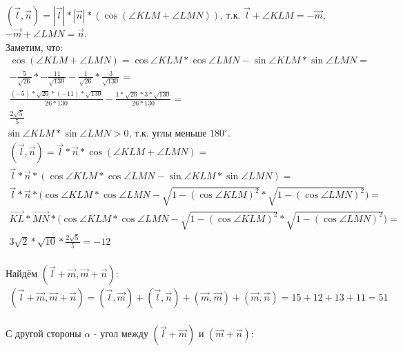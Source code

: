 		$(\overrightarrow{l}, \overrightarrow{n}) = |\overrightarrow{l}|*|\overrightarrow{n}|*(\cos(\angle KLM + \angle LMN))$, т.к. $\overrightarrow{l} + \angle KLM = - \overrightarrow{m}$, $-\overrightarrow{m} + \angle LMN = \overrightarrow{n}$.\\ Заметим, что: 
		\begin{gather*} 
			\cos(\angle KLM + \angle LMN) = 
			\cos \angle KLM * \cos \angle LMN - \sin \angle KLM * \sin \angle LMN = \\
			-\frac{5}{\sqrt{26}} * -\frac{11}{\sqrt{130}} - \frac{1}{\sqrt{26}} * \frac{3}{\sqrt{130}} = \\
			\frac{(-5)*\sqrt{26}*(-11)*\sqrt{130}}{26*130} - \frac{1*\sqrt{26}*3*\sqrt{130}}{26*130} = \\
			\frac{2 \sqrt{5}}{5}
		\end{gather*}
		$\sin \angle KLM * \sin \angle LMN > 0$, т.к. углы меньше $180^\circ$.
		\\
		\begin{gather*} 
			(\overrightarrow{l}, \overrightarrow{n}) = \overrightarrow{l} * \overrightarrow{n} * \cos(\angle KLM + \angle LMN) = \\
			\overrightarrow{l} * \overrightarrow{n} * (\cos \angle KLM * \cos \angle LMN - \sin \angle KLM * \sin \angle LMN) = \\
			\overrightarrow{l} * \overrightarrow{n} * \biggl( \cos \angle KLM * \cos \angle LMN - \sqrt{1 - (\cos \angle KLM)^2} * \sqrt{1 - (\cos \angle LMN)^2} \biggl)= \\
			\overrightarrow{KL} * \overrightarrow{MN} * \biggl( \cos \angle KLM * \cos \angle LMN - \sqrt{1 - (\cos \angle KLM)^2} * \sqrt{1 - (\cos \angle LMN)^2} \biggl)= \\
			3\sqrt{2}*\sqrt{10}*\frac{2 \sqrt{5}}{5} = -12 
		\end{gather*}
		\\	
		Найдём $(\overrightarrow{l} + \overrightarrow{m}, \overrightarrow{m} + \overrightarrow{n})$: 	
		\begin{gather*} 
			(\overrightarrow{l} + \overrightarrow{m}, \overrightarrow{m} + \overrightarrow{n}) = (\overrightarrow{l}, \overrightarrow{m}) + (\overrightarrow{l}, \overrightarrow{n}) + (\overrightarrow{m}, \overrightarrow{m}) + (\overrightarrow{m}, \overrightarrow{n}) = 15 + 12 + 13 + 11 = 51
		\end{gather*}
		\\
		С другой стороны $\alpha$ - угол между $(\overrightarrow{l} + \overrightarrow{m})$ и $(\overrightarrow{m} + \overrightarrow{n})$:
